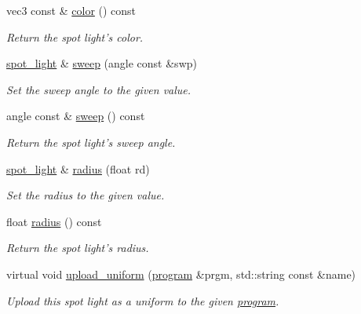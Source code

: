 \begin{DoxyCompactItemize}
vec3 const \& \hyperlink{classgfx_1_1spot__light_a89f8d6992f3998ad2351bd26530aa013}{color} () const 
\begin{DoxyCompactList}\small\item\em Return the spot light's color. \end{DoxyCompactList}\item 
\hyperlink{classgfx_1_1spot__light}{spot\-\_\-light} \& \hyperlink{classgfx_1_1spot__light_ad5f1e00690b8b80f076c03dae22f9acc}{sweep} (angle const \&swp)
\begin{DoxyCompactList}\small\item\em Set the sweep angle to the given value. \end{DoxyCompactList}\item 
angle const \& \hyperlink{classgfx_1_1spot__light_aa986225d127e8eda7c8b446ac73f0480}{sweep} () const 
\begin{DoxyCompactList}\small\item\em Return the spot light's sweep angle. \end{DoxyCompactList}\item 
\hyperlink{classgfx_1_1spot__light}{spot\-\_\-light} \& \hyperlink{classgfx_1_1spot__light_a01e0156f753d87092ede71ee6500a6a7}{radius} (float rd)
\begin{DoxyCompactList}\small\item\em Set the radius to the given value. \end{DoxyCompactList}\item 
float \hyperlink{classgfx_1_1spot__light_a71c3bf7b7ea643b2795713f172f2adeb}{radius} () const 
\begin{DoxyCompactList}\small\item\em Return the spot light's radius. \end{DoxyCompactList}\item 
virtual void \hyperlink{classgfx_1_1spot__light_adde12a9e73e9f00044894af91008c869}{upload\-\_\-uniform} (\hyperlink{classgfx_1_1program}{program} \&prgm, std\-::string const \&name)
\begin{DoxyCompactList}\small\item\em Upload this spot light as a uniform to the given \hyperlink{classgfx_1_1program}{program}. \end{DoxyCompactList}\end{DoxyCompactItemize}
